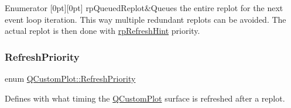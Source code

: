 \begin{DoxyEnumFields}{Enumerator}
[0pt][0pt]{}\mbox{\label{class_q_custom_plot_a45d61392d13042e712a956d27762aa39a074ea69d5b4756518e334e71a0ba4ad4}} 
rp\+Queued\+Replot&Queues the entire replot for the next event loop iteration. This way multiple redundant replots can be avoided. The actual replot is then done with \hyperlink{class_q_custom_plot_a45d61392d13042e712a956d27762aa39a5349b4ed6366760e34653bc54613a5ad}{rp\+Refresh\+Hint} priority. \\
\hline

\end{DoxyEnumFields}
\mbox{\label{class_q_custom_plot_a45d61392d13042e712a956d27762aa39}} 
\subsubsection{\texorpdfstring{Refresh\+Priority}{RefreshPriority}\hspace{0.1cm}{\footnotesize\ttfamily [2/2]}}
{\footnotesize\ttfamily enum \hyperlink{class_q_custom_plot_a45d61392d13042e712a956d27762aa39}{Q\+Custom\+Plot\+::\+Refresh\+Priority}}

Defines with what timing the \hyperlink{class_q_custom_plot}{Q\+Custom\+Plot} surface is refreshed after a replot.

